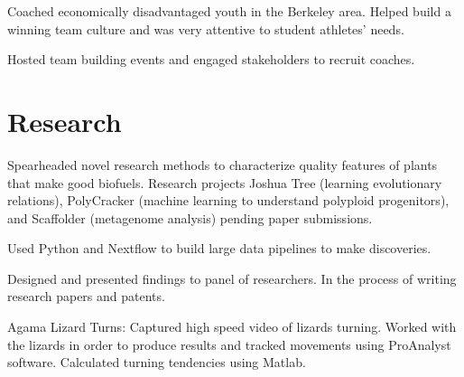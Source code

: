 \documentclass[]{deedy-resume-openfont}
\begin{document}
\begin{minipage}[t]{0.66\textwidth}
\begin{tightemize}
\item Coached economically disadvantaged youth in the Berkeley area. Helped build a winning team culture and was very attentive to student athletes' needs.
\item Hosted team building events and engaged stakeholders to recruit coaches.
\end{tightemize}
\sectionsep


\section{Research}
\begin{tightemize}\item Spearheaded novel research methods to characterize quality features of plants that make good biofuels. Research projects Joshua Tree (learning evolutionary relations), PolyCracker (machine learning to understand polyploid progenitors), and Scaffolder (metagenome analysis) pending paper submissions.
\item Used Python and Nextflow to build large data pipelines to make discoveries.
\item Designed and presented findings to panel of researchers. In the process of writing research papers and patents.
\end{tightemize}
\sectionsep

\begin{tightemize}
\item Agama Lizard Turns: Captured high speed video of lizards turning. Worked with the lizards in order to produce results and tracked movements using ProAnalyst software. Calculated turning tendencies using Matlab.
\end{tightemize}
\sectionsep





\end{minipage} 
\end{document}
